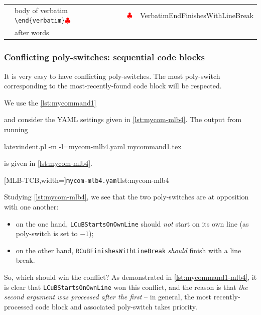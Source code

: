 \begin{longtable}{llll}
                                         & body of verbatim \verb!\end{verbatim}!$\color{red}\clubsuit$ & $\color{red}\clubsuit$             & VerbatimEndFinishesWithLineBreak                                  \\
                                         & after words                                                       &                                         &                                                                   \\
  \bottomrule
 \end{longtable}

\subsubsection{Conflicting poly-switches: sequential code blocks}
 It is very easy to have conflicting poly-switches. The most poly-switch corresponding to
 the most-recently-found code block will be respected.

 \begin{example}
 We use the \cref{lst:mycommand1}


 and consider the YAML settings given in \cref{lst:mycom-mlb4}. The output from running
  

 \begin{commandshell}
latexindent.pl -m -l=mycom-mlb4.yaml mycommand1.tex
\end{commandshell}

 is given in \cref{lst:mycom-mlb4}.

 \begin{cmhtcbraster}
  [MLB-TCB,width=\linewidth]{\texttt{mycom-mlb4.yaml}}{lst:mycom-mlb4}
 \end{cmhtcbraster}

 Studying \cref{lst:mycom-mlb4}, we see that the two poly-switches are at opposition with
 one another:
 \begin{itemize}
  \item on the one hand, \texttt{LCuBStartsOnOwnLine} should \emph{not} start on its own
        line (as poly-switch is set to $-1$);
  \item on the other hand, \texttt{RCuBFinishesWithLineBreak} \emph{should} finish with a
        line break.
 \end{itemize}
 So, which should win the conflict? As demonstrated in \cref{lst:mycommand1-mlb4}, it is
 clear that \texttt{LCuBStartsOnOwnLine} won this conflict, and the reason is that
 \emph{the second argument was processed after the first} -- in general, the most
 recently-processed code block and associated poly-switch takes priority.
 \end{example}

